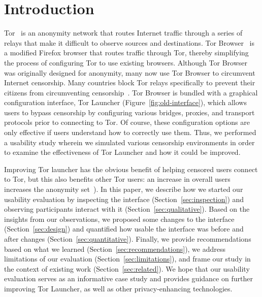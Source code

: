 \documentclass[USenglish,oneside,twocolumn]{article}
\begin{document}


\maketitle

\section{Introduction}
Tor~\cite{dingledine2004tor} is an anonymity network that routes Internet traffic through a series of relays 
that make it difficult to observe sources and destinations. Tor Browser~\cite{torbrowser} is a modified Firefox browser that routes traffic through Tor, thereby simplifying the process of configuring Tor to use existing browsers. Although Tor Browser was originally designed for anonymity, many now use Tor Browser to circumvent Internet censorship. Many countries block Tor relays specifically to prevent their citizens from circumventing censorship~\cite{winter2012great}. Tor Browser is bundled with a graphical configuration interface, Tor Launcher (Figure~\ref{fig:old-interface}), which allows users to bypass censorship by configuring various bridges, proxies, and transport protocols prior to connecting to Tor. Of course, these configuration options are only effective if users understand how to correctly use them. Thus, we performed a usability study wherein we simulated various censorship environments in order to examine the effectiveness of Tor Launcher and how it could be improved.

Improving Tor launcher has the obvious benefit of helping censored users connect to Tor, but this also benefits other Tor users: an increase in overall users increases the anonymity set~\cite{dingledine2006anonymity}). In this paper, we describe how we started our usability evaluation by inspecting the interface (Section~\ref{sec:inspection}) and observing participants interact with it (Section~\ref{sec:qualitative}). Based on the insights from our observations, we proposed some changes to the interface (Section~\ref{sec:design}) and
quantified how usable the interface was before and after changes (Section~\ref{sec:quantitative}). Finally, we provide recommendations based on what we learned (Section~\ref{sec:recommendations}), we address
limitations of our evaluation (Section~\ref{sec:limitations}), and frame our study in the context of existing work (Section~\ref{sec:related}). We hope that our usability evaluation serves as an informative case study and provides guidance on further improving Tor Launcher, as well as other privacy-enhancing technologies. 
\end{document}
